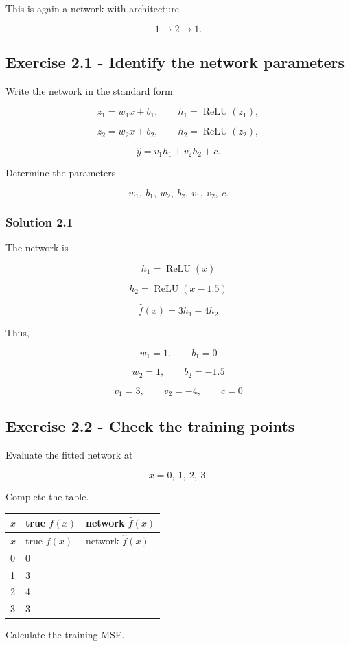 \documentclass[10pt]{article}
\begin{document}
This is again a network with architecture

\[
1\rightarrow2\rightarrow1.
\]

\subsection*{Exercise 2.1 - Identify the network parameters}
Write the network in the standard form

\[
z_1=w_1x+b_1,
\qquad
h_1=\operatorname{ReLU}(z_1),
\]

\[
z_2=w_2x+b_2,
\qquad
h_2=\operatorname{ReLU}(z_2),
\]

\[
\hat y=v_1h_1+v_2h_2+c.
\]

Determine the parameters

\[
w_1,\ b_1,\ w_2,\ b_2,\ v_1,\ v_2,\ c.
\]

\begingroup\color{red}

\subsubsection*{Solution 2.1}
The network is

\[
h_1=\operatorname{ReLU}(x)
\]

\[
h_2=\operatorname{ReLU}(x-1.5)
\]

\[
\hat f(x)=3h_1-4h_2
\]

Thus,

\[
w_1=1,
\qquad
b_1=0
\]

\[
w_2=1,
\qquad
b_2=-1.5
\]

\[
v_1=3,
\qquad
v_2=-4,
\qquad
c=0
\]

\par\endgroup

\subsection*{Exercise 2.2 - Check the training points}
Evaluate the fitted network at

\[
x=0,\ 1,\ 2,\ 3.
\]

Complete the table.

\begingroup
\small
\setlength{\tabcolsep}{4pt}
\begin{longtable}{l|l|l}
$x$ & true $f(x)$ & network $\hat f(x)$ \\[1.5pt]
\hline
\endfirsthead
$x$ & true $f(x)$ & network $\hat f(x)$ \\[1.5pt]
\hline
\endhead
\rule{0pt}{2.4ex}0 & 0 &  $\phantom{-0.00}$ \\[3pt]
\rule{0pt}{2.4ex}1 & 3 &  $\phantom{-0.00}$ \\[3pt]
\rule{0pt}{2.4ex}2 & 4 &  $\phantom{-0.00}$ \\[3pt]
\rule{0pt}{2.4ex}3 & 3 &  $\phantom{-0.00}$ \\[3pt]
\end{longtable}
\endgroup
Calculate the training MSE.
\end{document}
